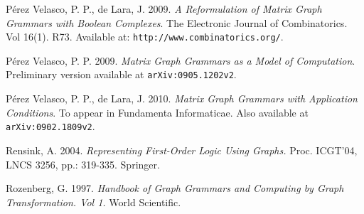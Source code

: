 \documentclass{fundam}
\begin{document}
\begin{thebibliography}{10}
 P\'erez Velasco, P. P., de Lara, J. 2009.
  \emph{A Reformulation of Matrix Graph Grammars with Boolean
    Complexes}. The Electronic Journal of Combinatorics. Vol
  16(1). R73. Available at: {\texttt{http://www.combinatorics.org/}}.

 P\'erez Velasco, P. P. 2009. \emph{Matrix Graph
    Grammars as a Model of Computation}. Preliminary version available
  at {\texttt{arXiv:0905.1202v2}}.

 P\'erez Velasco, P. P., de Lara,
  J. 2010. \emph{Matrix Graph Grammars with Application
    Conditions}. To appear in Fundamenta Informaticae. Also available
  at {\texttt{arXiv:0902.1809v2}}.

 Rensink, A. 2004. {\em Representing First-Order
    Logic Using Graphs.}  Proc. ICGT'04, LNCS 3256, pp.: 319-335.
  Springer.

 {Rozenberg, G.} 1997.  {\em Handbook of Graph
    Grammars and Computing by Graph Transformation. Vol 1. } World
  Scientific.

\end{thebibliography}
\end{document}
